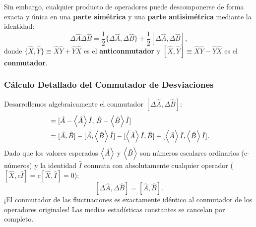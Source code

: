 Sin embargo, cualquier producto de operadores puede descomponerse de forma exacta y única en una \textbf{parte simétrica} y una \textbf{parte antisimétrica} mediante la identidad:
\begin{equation}
    \Delta\hat{A}\Delta\hat{B} = \frac{1}{2}\{\Delta\hat{A}, \Delta\hat{B}\} + \frac{1}{2}[\Delta\hat{A}, \Delta\hat{B}],
    \label{eq:symmetric_antisymmetric_decomp}
\end{equation}
donde $\{\hat{X}, \hat{Y}\} \equiv \hat{X}\hat{Y} + \hat{Y}\hat{X}$ es el \textbf{anticonmutador} y $[\hat{X}, \hat{Y}] \equiv \hat{X}\hat{Y} - \hat{Y}\hat{X}$ es el \textbf{conmutador}.

\subsubsection{Cálculo Detallado del Conmutador de Desviaciones}
Desarrollemos algebraicamente el conmutador $[\Delta\hat{A}, \Delta\hat{B}]$:
\begin{align}
    [\Delta\hat{A}, \Delta\hat{B}] &= [\hat{A} - \ev{\hat{A}}\hat{I}, \, \hat{B} - \ev{\hat{B}}\hat{I}] \nonumber\\
    &= [\hat{A}, \hat{B}] - [\hat{A}, \ev{\hat{B}}\hat{I}] - [\ev{\hat{A}}\hat{I}, \hat{B}] + [\ev{\hat{A}}\hat{I}, \ev{\hat{B}}\hat{I}].
\end{align}
Dado que los valores esperados $\left\langle \hat{A} \right\rangle$ y $\left\langle \hat{B} \right\rangle$ son números escalares ordinarios (c-números) y la identidad $\hat{I}$ conmuta con absolutamente cualquier operador ($[\hat{X}, c\hat{I}] = c[\hat{X}, \hat{I}] = 0$):
\begin{equation}
    \boxed{[\Delta\hat{A}, \Delta\hat{B}] = [\hat{A}, \hat{B}]}.
    \label{eq:comm_dev_eq}
\end{equation}
¡El conmutador de las fluctuaciones es exactamente idéntico al conmutador de los operadores originales! Las medias estadísticas constantes se cancelan por completo.

